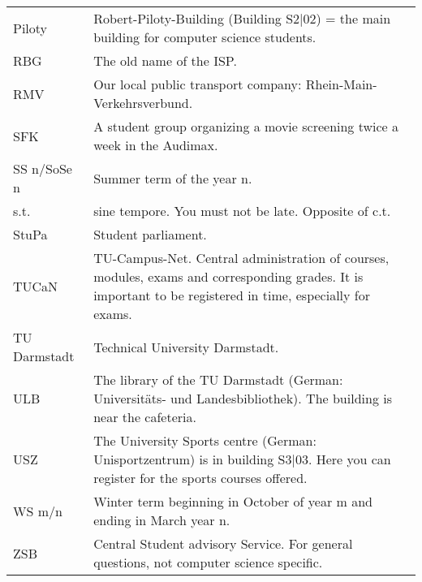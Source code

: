 \begin{longtable}{p{20mm}p{85mm}}
Piloty	&	Robert-Piloty-Building (Building S2$|$02) = the main building for computer science students.\\
RBG		&	The old name of the ISP.\\
RMV		&	Our local public transport company: Rhein-Main-Verkehrsverbund.\\
SFK		&	A student group organizing a movie screening twice a week in the Audimax.\\
SS n/SoSe n&Summer term of the year n.\\
s.t.	&	sine tempore. You must not be late. Opposite of c.t.\\
StuPa	&	Student parliament.\\
TUCaN	&	TU-Campus-Net. Central administration of courses, modules, exams and corresponding grades. It is important to be registered in time, especially for exams.\\
TU Darmstadt&Technical University Darmstadt.\\
ULB		&	 The library of the TU Darmstadt (German: Universitäts- und Landesbibliothek). The building is near the cafeteria.\\
USZ		&	The University Sports centre (German: Unisportzentrum) is in building S3$|$03. Here you can register for the sports courses offered.\\
WS m/n	&	Winter term beginning in October of year m and ending in March year n.\\
ZSB		&	Central Student advisory Service. For general questions, not computer science specific.\\
\end{longtable}
